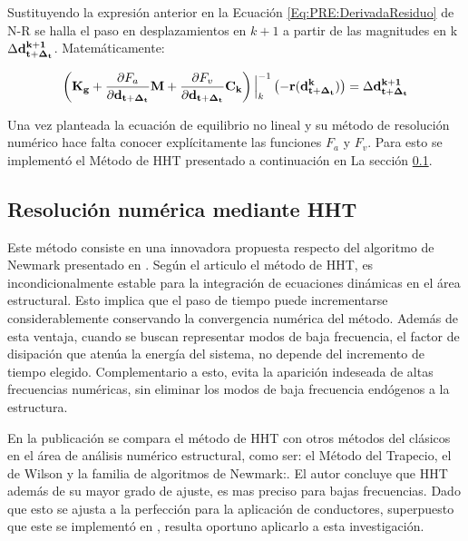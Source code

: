 Sustituyendo la expresión anterior en la Ecuación \eqref{Eq:PRE:DerivadaResiduo} de N-R se halla el paso en desplazamientos en $k+1$ a partir de las magnitudes en k $\Delta \bf{d}^{k+1}_{t+\Delta_t}$. Matemáticamente:



\begin{equation}\label{Eq:Pre:Incremento}
	\left (\bf{K}_g+\frac{\partial\text{$ F_a$}}{\partial \bf{{d}}_{t+\Delta_t}}\bf{M} + \frac{\partial\text{$ F_v$}}{\partial \bf{{d}}_{t+\Delta_t}}\bf{C}_k \right)\Big|_k^{-1} \left(-\bf{r}(\bf{d}^k_{t+\Delta_t})\right)=  \Delta\bf{d}^{k+1}_{t+\Delta_t}
\end{equation}

Una vez planteada la ecuación de equilibrio no lineal y su método de resolución numérico hace falta conocer explícitamente las funciones $F_a$ y $F_v$. Para esto se implementó el Método de HHT presentado a continuación en La sección \ref{Sec:MET:HHT}. 



\subsection{Resolución numérica mediante HHT}\label{Sec:MET:HHT}
%
 Este método consiste en una innovadora propuesta respecto del algoritmo de Newmark presentado en \cite{newmark1959method}. Según el articulo \cite{hilber1977improved} el método de HHT, es incondicionalmente estable para la integración de ecuaciones dinámicas en el área estructural. Esto implica que el paso de tiempo puede incrementarse considerablemente conservando la convergencia numérica del método. Además de esta ventaja, cuando se buscan representar modos de baja frecuencia, el factor de disipación que atenúa la energía del sistema, no depende del incremento de tiempo elegido. Complementario a esto,  evita la aparición indeseada de altas frecuencias numéricas, sin eliminar los modos de baja frecuencia endógenos a la estructura. 
 
 En la publicación \citep{hilber1977improved} se compara el método de HHT con otros métodos del clásicos en el área de análisis numérico estructural, como ser: el Método del Trapecio, el de Wilson y la familia de algoritmos de Newmark:. El autor concluye que HHT además de su mayor grado de ajuste, es mas preciso para bajas frecuencias. Dado que esto se ajusta a la perfección para la aplicación de conductores, superpuesto que este se implementó en \cite{Le2014}, resulta oportuno aplicarlo a esta investigación.
 
